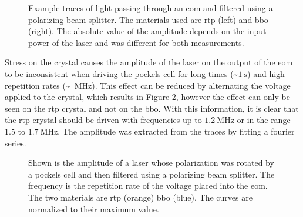 \begin{figure}[t]
\label{fig:eom_example_traces}
\caption{Example traces of light passing through an \ac{eom} and filtered using a polarizing beam splitter. The materials used are \ac{rtp} (left) and \ac{bbo} (right). The absolute value of the amplitude depends on the input power of the laser and was different for both measurements.}
\end{figure}

Stress on the crystal causes the amplitude of the laser on the output of the \ac{eom} to be inconsistent when driving the pockels cell for long times (\~{}$\SI{1}{\second}$) and high repetition rates (\~{}\SI{}{MHz}). This effect can be reduced by alternating the voltage applied to the crystal, which results in Figure \ref{fig:eom_amp_time}, however the effect can only be seen on the \ac{rtp} crystal and not on the \ac{bbo}. With this information, it is clear that the \ac{rtp} crystal should be driven with frequencies up to $\SI{1.2}{\mega \hertz}$ or in the range $1.5$ to $\SI{1.7}{\mega \hertz}$. The amplitude was extracted from the traces by fitting a fourier series.

\begin{figure}[t]
\label{fig:eom_amp_time}
\caption{Shown is the amplitude of a laser whose polarization was rotated by a pockels cell and then filtered using a polarizing beam splitter. The frequency is the repetition rate of the voltage placed into the \ac{eom}. The two materials are \ac{rtp} (orange) \ac{bbo} (blue). The curves are normalized to their maximum value.}
\end{figure}

